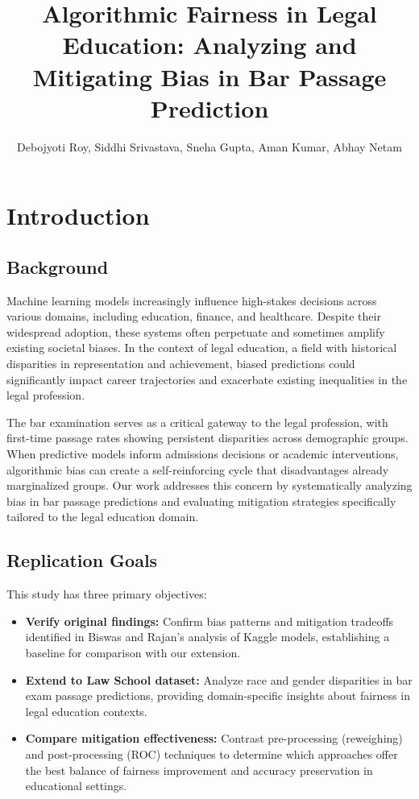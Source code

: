 \documentclass[10pt,journal,compsoc]{IEEEtran}
\begin{document}
\title{Algorithmic Fairness in Legal Education: Analyzing and Mitigating Bias in Bar Passage Prediction}

\author{Debojyoti Roy, Siddhi Srivastava, Sneha Gupta, Aman Kumar, Abhay Netam}

\maketitle

\section{Introduction}
\subsection{Background}
Machine learning models increasingly influence high-stakes decisions across various domains, including education, finance, and healthcare. Despite their widespread adoption, these systems often perpetuate and sometimes amplify existing societal biases. In the context of legal education, a field with historical disparities in representation and achievement, biased predictions could significantly impact career trajectories and exacerbate existing inequalities in the legal profession.

The bar examination serves as a critical gateway to the legal profession, with first-time passage rates showing persistent disparities across demographic groups. When predictive models inform admissions decisions or academic interventions, algorithmic bias can create a self-reinforcing cycle that disadvantages already marginalized groups. Our work addresses this concern by systematically analyzing bias in bar passage predictions and evaluating mitigation strategies specifically tailored to the legal education domain.

\subsection{Replication Goals}
This study has three primary objectives:
\begin{itemize}
\item \textbf{Verify original findings:} Confirm bias patterns and mitigation tradeoffs identified in Biswas and Rajan's analysis of Kaggle models, establishing a baseline for comparison with our extension.
\item \textbf{Extend to Law School dataset:} Analyze race and gender disparities in bar exam passage predictions, providing domain-specific insights about fairness in legal education contexts.
\item \textbf{Compare mitigation effectiveness:} Contrast pre-processing (reweighing) and post-processing (ROC) techniques to determine which approaches offer the best balance of fairness improvement and accuracy preservation in educational settings.
\end{itemize}
\end{document}
